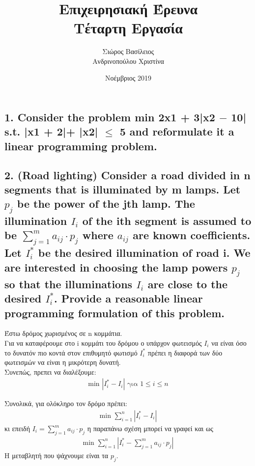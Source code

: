 \documentclass[12pt]{article}
\title{\hugeΑλγοριθμική Επιχειρησιακή Έρευνα\\Τέταρτη Εργασία}
\author{Σιώρος Βασίλειος\\Ανδρινοπούλου Χριστίνα}
\date{Νοέμβριος 2019}
\newcommand{\centered}[1]{\begin{align*}#1\end{align*}}
\begin{document}
\maketitle


\pagebreak


\subsection*{1. Consider the problem
min 2x1 + 3|x2 \ensuremath{-} 10|
s.t. |x1 + 2|+ |x2| \ensuremath{\leq} 5
and reformulate it a linear programming problem.}

\vspace{2in}

\pagebreak

\subsection*{2. (Road lighting) Consider a road divided in n segments that is illuminated by m
	lamps. Let \(p_{j}\) be the power of the jth lamp. The illumination \(I_{i}\) of the ith segment is assumed
	to be \(\sum_{j=1}^{m}{a_{ij} \cdot p_{j}}\)
	where \(a_{ij}\) are known coefficients. Let \(I_{i}^{*}\) be the desired illumination of road i.
	We are interested in choosing the lamp powers \(p_{j}\) so that the illuminations \(I_{i}\) are close to the
	desired \(I_{i}^{*}\). Provide a reasonable linear programming formulation of this problem.}

Έστω δρόμος χωρισμένος σε n κομμάτια. \\

Για να καταφέρουμε στο i κομμάτι του δρόμου ο υπάρχον φωτεισμός \(I_{i}\) να είναι όσο το δυνατόν πιο κοντά στον επιθυμητό φωτισμό \(I_{i}^{*}\) πρέπει η διαφορά των δύο φωτεισμών να είναι η μικρότερη δυνατή. \\

Συνεπώς, πρεπει να διαλέξουμε:
\centered{\mbox{min }\left| I_{i}^{*} - I_{i} \right| \mbox{ για } 1 \leq i \leq n} 

Συνολικά, για ολόκληρο τον δρόμο πρέπει: \\
\centered{\mbox{min } \sum_{i=1}^{n}{\left| I_{i}^{*} - I_{i} \right|} }
κι επειδή \(I_{i} = \sum_{j=1}^{m}{a_{ij} \cdot p_{j}}\) η παραπάνω σχέση μπορεί να γραφεί και ως \\
\centered{\mbox{min } \sum_{i=1}^{n}{\left| I_{i}^{*} - \sum_{j=1}^{m}{a_{ij} \cdot p_{j}} \right|} }
Η μεταβλητή που ψάχνουμε είναι τα \(p_{j}\). \\
\end{document}
